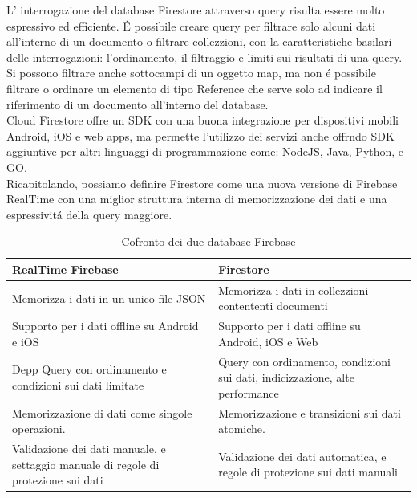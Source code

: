 L' interrogazione del database Firestore attraverso query risulta essere molto espressivo ed efficiente. \'E possibile creare query per filtrare solo alcuni dati all'interno di un documento o filtrare collezzioni, con la caratteristiche basilari delle interrogazioni: l'ordinamento, il filtraggio e limiti sui risultati di una query. Si possono filtrare anche sottocampi di un oggetto map, ma non \'e possibile filtrare o ordinare un elemento di tipo Reference che serve solo ad indicare il riferimento di un documento all'interno del database.\\
Cloud Firestore offre un SDK con una buona integrazione per dispositivi mobili Android, iOS e web apps, ma permette l'utilizzo dei servizi anche offrndo SDK aggiuntive per altri linguaggi di programmazione come: NodeJS, Java, Python, e GO.\\


Ricapitolando, possiamo definire Firestore come una nuova versione di Firebase RealTime con una miglior struttura interna di memorizzazione dei dati e una espressivit\'a della query maggiore.

\begin{table}[h]
\begin{center}

\begin{tabular}{|p{7cm}|p{7cm}|}
    \hline
    \textbf{RealTime Firebase} & \textbf{Firestore} \\ \hline
    Memorizza i dati in un unico file JSON & Memorizza i dati in collezzioni contententi documenti \\ \hline
    Supporto per i dati offline su Android e iOS & Supporto per i dati offline su Android, iOS e Web \\ \hline
    Depp Query con ordinamento e condizioni sui dati limitate & Query con ordinamento, condizioni sui dati, indicizzazione, alte performance \\ \hline
    Memorizzazione di dati come singole operazioni. & Memorizzazione e transizioni sui dati atomiche.\\ \hline
    Validazione dei dati manuale, e settaggio manuale di regole di protezione sui dati &  Validazione dei dati automatica, e regole di protezione sui dati manuali\\
\hline
\end{tabular}
\caption[Firebase vs Firestore ]{Cofronto dei due database Firebase}\label{tab:FirestorevSFirebase}
\end{center}
\end{table}



